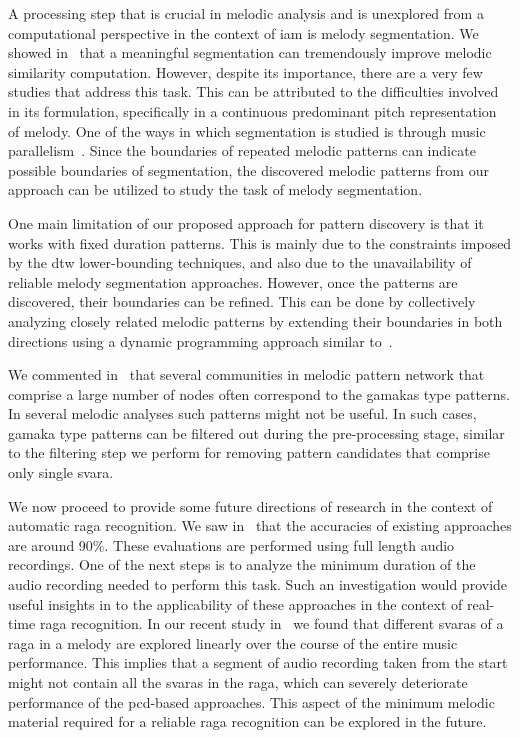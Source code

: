 A processing step that is crucial in melodic analysis and is unexplored from a computational perspective in the context of \gls{iam} is melody segmentation. We showed in~ that a meaningful segmentation can tremendously improve melodic similarity computation. However, despite its importance, there are a very few studies that address this task. This can be attributed to the difficulties involved in its formulation, specifically in a continuous predominant pitch representation of melody. One of the ways in which segmentation is studied is through music parallelism~\citep{Cambouropoulos2006,rodriguez2014comparing}. Since the boundaries of repeated melodic patterns can indicate possible boundaries of segmentation, the discovered melodic patterns from our approach can be utilized to study the task of melody segmentation.  

One main limitation of our proposed approach for pattern discovery is that it works with fixed duration patterns. This is mainly due to the constraints imposed by the \gls{dtw} lower-bounding techniques, and also due to the unavailability of reliable melody segmentation approaches. However, once the patterns are discovered, their boundaries can be refined. This can be done by collectively analyzing closely related melodic patterns by extending their boundaries in both directions using a dynamic programming approach similar to~\cite{muscariello2009variability}.

We commented in~ that several communities in melodic pattern network that comprise a large number of nodes often correspond to the \glspl{gamaka} type patterns. In several melodic analyses such patterns might not be useful. In such cases, \gls{gamaka} type patterns can be filtered out during the pre-processing stage, similar to the filtering step we perform for removing pattern candidates that comprise only single \gls{svara}. 

We now proceed to provide some future directions of research in the context of automatic \gls{raga} recognition. We saw in~ that the accuracies of existing approaches are around 90\%. These evaluations are performed using full length audio recordings. One of the next steps is to analyze the minimum duration of the audio recording needed to perform this task. Such an investigation would provide useful insights in to the applicability of these approaches in the context of real-time \gls{raga} recognition. In our recent study in~\cite{kaustuv_ismir_2016} we found that different \glspl{svara} of a \gls{raga} in a melody are explored linearly over the course of the entire music performance. This implies that a segment of audio recording taken from the start might not contain all the \glspl{svara} in the \gls{raga}, which can severely deteriorate performance of the \gls{pcd}-based approaches. This aspect of the minimum melodic material required for a reliable \gls{raga} recognition can be explored in the future. 

